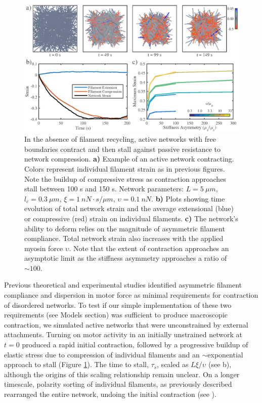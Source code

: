 \documentclass[10pt,letterpaper]{article}
\begin{document}
\begin{figure}[h!]
	\centering
	\includegraphics[width=\hsize]{figures/figure5}
	\caption{\label{fig:active_con} In the absence of filament recycling, active networks with free boundaries contract and then stall against passive resistance to network compression. \textbf{a)}  Example of an active network contracting. Colors represent individual filament strain as in previous figures.  Note the buildup of compressive stress as contraction approaches stall between 100 s and 150 s.  Network parameters: $L=5\: \mu m$, $l_c=0.3\: \mu m$, $\xi=1\: nN\cdot s/\mu m$, $\upsilon=0.1\: nN$.  \textbf{b)} Plots showing time evolution of total network strain and  the average extensional (blue) or compressive (red) strain on individual filaments.   \textbf{c)} The network's ability to deform relies on the magnitude of asymmetric filament compliance.  Total network strain also increases with the applied myosin force $\upsilon$. Note that the extent of contraction approaches an asymptotic limit as the stiffness asymmetry approaches a ratio of $\sim 100$.}
\end{figure}

Previous theoretical and experimental studies\cite{1367-2630-14-3-033037,rheo_2D1,rheo_active} identified asymmetric filament compliance and dispersion in motor force  as minimal requirements for contraction of disordered networks. To test if our simple implementation of these two requirements (see Models section) was sufficient to produce macroscopic contraction, we simulated active networks that were unconstrained by external attachments.  Turning on motor activity in an initially unstrained network at $t=0$ produced a rapid initial contraction, followed by a progressive buildup of elastic stress due to compression of individual filaments and an $\sim$exponential approach to stall (Figure \ref{fig:active_con}). The time to stall, $\tau_s$, scaled as $L\xi/\upsilon$ (see b), although the origins of this scaling relationship remain unclear.  On a longer timescale, polarity sorting of individual filaments, as previously described \cite{Ndlec:1997aa,Surrey1167} rearranged the entire network, undoing the initial contraction (see ).  
\end{document}
